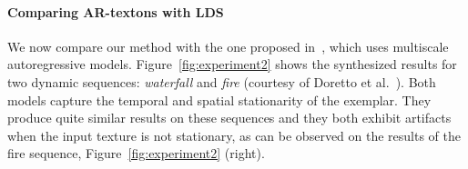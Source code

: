 \paragraph{Comparing AR-textons with LDS~\cite{Doretto04spatiallyhomogeneous}}

We now compare our method with the one proposed in~\cite{Doretto04spatiallyhomogeneous}, which uses multiscale autoregressive models.
Figure~\ref{fig:experiment2} shows the synthesized results for two dynamic sequences: {\it waterfall} and {\it fire} (courtesy of Doretto et al.~\cite{Doretto04spatiallyhomogeneous}). Both models capture the temporal and spatial stationarity of the exemplar. They produce quite similar results on these sequences and they both exhibit artifacts when the input texture is not stationary, as can be observed on the results of the fire sequence, Figure~\ref{fig:experiment2} (right).





